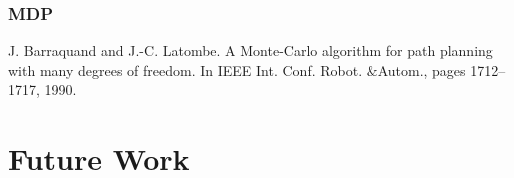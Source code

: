 \documentclass[MTech]{iitmdiss}
\begin{document}
\subsection{MDP}


J. Barraquand and J.-C. Latombe. A Monte-Carlo algorithm for path planning with many degrees of freedom. In IEEE Int. Conf. Robot. $\&$Autom., pages 1712–1717, 1990.



\chapter{Future Work}

%
\pagebreak
\begin{singlespace}
  \begin{small}
	
  \end{small}
\end{singlespace}

\end{document}
